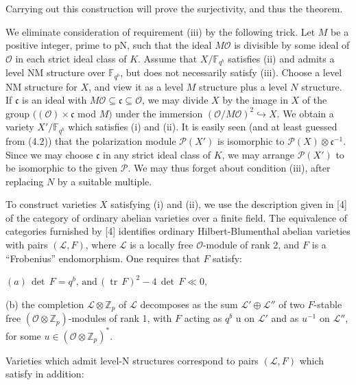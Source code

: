 \documentclass[11pt]{article}
\newcommand{\DFormula}[1]{\par\smallskip\noindent\begin{adjustbox}{max width=\linewidth}$\displaystyle #1$\end{adjustbox}\par\smallskip}
\begin{document}
Carrying out this construction will prove the surjectivity, and thus the theorem.\par
\par
We eliminate consideration of requirement (iii) by the following trick. Let \(M\) be a positive integer, prime to pN, such that the ideal \(M\mathcal{O}\) is divisible by some ideal of \(\mathcal{O}\) in each strict ideal class of \(K\). Assume that \(X/\mathbb{F}_{q^{b}}\) satisfies (ii) and admits a level NM structure over \(\mathbb{F}_{q^{b}}\), but does not necessarily satisfy (iii). Choose a level NM structure for \(X\), and view it as a level \(M\) structure plus a level \(N\) structure. If \(𝔠\) is an ideal with \(M\mathcal{O}\subseteq 𝔠\subseteq \mathcal{O}\), we may divide \(X\) by the image in \(X\) of the group \(((\mathcal{O})\times 𝔠\) mod \(M)\) under the immersion \((\mathcal{O}/M\mathcal{O})^{2}\hookrightarrow X\). We obtain a variety \(X'/\mathbb{F}_{q^{b}}\) which satisfies (i) and (ii). It is easily seen (and at least guessed from (4.2)) that the polarization module \(\mathcal{P}(X')\) is isomorphic to \(\mathcal{P}(X)\otimes 𝔠^{-1}\). Since we may choose \(𝔠\) in any strict ideal class of \(K\), we may arrange \(\mathcal{P}(X')\) to be isomorphic to the given \(\mathcal{P}\). We may thus forget about condition (iii), after replacing \(N\) by a suitable multiple.\par
\par
To construct varieties \(X\) satisfying (i) and (ii), we use the description given in [4] of the category of ordinary abelian varieties over a finite field. The equivalence of categories furnished by [4] identifies ordinary Hilbert-Blumenthal abelian varieties with pairs \((\mathcal{L},F)\), where \(\mathcal{L}\) is a locally free \(\mathcal{O}\)-module of rank 2, and \(F\) is a “Frobenius” endomorphism. One requires that \(F\) satisfy:\par
\par
\DFormula{(a)\,\operatorname{det}\,F=q^{b},\,\text{and}\,(\operatorname{tr}\,F)^{2}-4\,\operatorname{det}\,F\ll 0,}
(b) the completion \(\mathcal{L}\otimes \mathbb{Z}_{p}\) of \(\mathcal{L}\) decomposes as the sum \(\mathcal{L}'\oplus \mathcal{L}''\) of two \(F\)-stable free \((\mathcal{O}\otimes \mathbb{Z}_{p})\)-modules of rank 1, with \(F\) acting as \(q^{b}\) u on \(\mathcal{L}'\) and as \(u^{-1}\) on \(\mathcal{L}''\), for some \(u\in (\mathcal{O}\otimes \mathbb{Z}_{p})^{\ast}\).\par
\par
[The number u appearing in (b) is the number u associated above to the abelian variety corresponding to \((\mathcal{L},F).]\) Varieties which admit level-N structures correspond to pairs \((\mathcal{L},F)\) which satisfy in addition:\par
\end{document}
